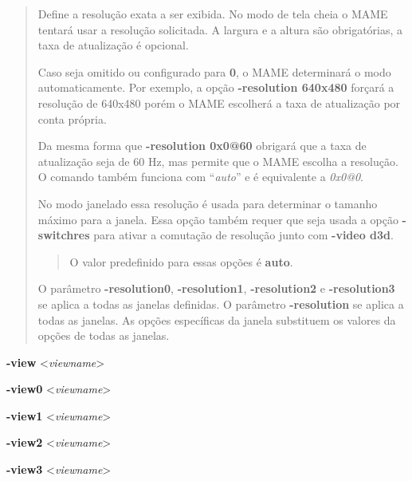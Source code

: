 \documentclass[letterpaper,10pt,brazil]{sphinxmanual}
\begin{document}
\begin{quote}

Define a resolução exata a ser exibida. No modo de tela cheia o MAME
tentará usar a resolução solicitada. A largura e a altura são
obrigatórias, a taxa de atualização é opcional.

Caso seja omitido ou configurado para \textbf{0}, o MAME determinará o
modo automaticamente. Por exemplo, a opção \textbf{-resolution 640x480}
forçará a resolução de 640x480 porém o MAME escolherá a taxa de
atualização por conta própria.

Da mesma forma que \textbf{-resolution 0x0@60} obrigará que a taxa de
atualização seja de 60 Hz, mas permite que o MAME escolha a
resolução. O comando também funciona com ``\emph{auto}'' e é equivalente a
\emph{0x0@0}.

No modo janelado essa resolução é usada para determinar o tamanho
máximo para a janela. Essa opção também requer que seja usada a
opção \textbf{-switchres} para ativar a comutação de resolução junto com
\textbf{-video d3d}.
\begin{quote}

O valor predefinido para essas opções é \textbf{auto}.
\end{quote}

O parâmetro \textbf{-resolution0}, \textbf{-resolution1}, \textbf{-resolution2} e
\textbf{-resolution3} se aplica a todas as janelas definidas.
O parâmetro \textbf{-resolution} se aplica a todas as janelas.
As opções específicas da janela substituem os valores da opções de
todas as janelas.
\end{quote}
\label{commandline/commandline-all:mame-commandline-view}
\begin{DUlineblock}{0em}
\item[] \textbf{-view} \textless{}\emph{viewname}\textgreater{}
\item[] \textbf{-view0} \textless{}\emph{viewname}\textgreater{}
\item[] \textbf{-view1} \textless{}\emph{viewname}\textgreater{}
\item[] \textbf{-view2} \textless{}\emph{viewname}\textgreater{}
\item[] \textbf{-view3} \textless{}\emph{viewname}\textgreater{}
\end{DUlineblock}
\end{document}

